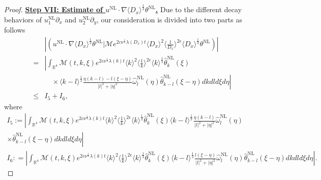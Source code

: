 \documentclass[reqno, 12pt]{amsart} %
\theoremstyle{plain} %
\theoremstyle{definition}
\theoremstyle{remark}
\numberwithin{equation}{section} %
\newcommand{\lt}{\left}
\newcommand{\rt}{\right}
\newcommand{\px}{\partial_x}
\newcommand{\py}{\partial_y}
\begin{document}
\begin{proof}
		
		
		\underline{\bf Step VII: Estimate of $   u^{\mathrm{NL}} \cdot  \nabla \langle D_x \rangle^\frac13 \theta^{\mathrm{NL}}$.} Due to the different decay behaviors of $u_1^{\mathrm{NL}} \px    $ and $u_2^{\mathrm{NL}} \py   $, our consideration is divided into two parts as follows
		$$
		\begin{aligned}
			& \left|\left(  u^{\mathrm{NL}} \cdot \nabla \langle D_x \rangle^\frac13 \theta^{\mathrm{NL}} \big| \mathcal{M} e^{2 c \nu^{\frac{1}{3}} \lambda\left(D_x\right) t}\langle D_x\rangle^2\langle\frac{1}{D_x}\rangle^{2 \epsilon} \langle D_x \rangle^\frac13 \theta^{\mathrm{NL}} \right)\right| \\
			= & \left|\int_{\mathbb{R}^4} \mathcal{M}(t, k, \xi) e^{2 c \nu^{\frac{1}{3}} \lambda(k) t}\langle k\rangle^2\langle\frac{1}{k}\rangle^{2 \epsilon} \langle k \rangle^\frac13\hat{\theta}_k^{\mathrm{NL}}(\xi) \rt.\\
			&\lt.\quad \times \langle k-l \rangle^\frac13  \frac{\eta(k-l)-l(\xi-\eta)}{|l|^2+|\eta|^2} \hat{\omega}_l^{\mathrm{NL}}(\eta) \hat{\theta}_{k-l}^{\mathrm{NL}}(\xi-\eta) d k d l d \xi d \eta\right| \\
			\leq & I_5+I_6,
		\end{aligned}
		$$ 
		where
		$$
		\begin{gathered}
			I_5 :=\left| \int_{\mathbb{R}^4} \mathcal{M}(t, k, \xi) e^{2 c \nu^{\frac{1}{3}} \lambda(k) t}\langle k\rangle^2\langle\frac{1}{k}\rangle^{2 \epsilon} \langle k \rangle^\frac13\hat{\theta}_k^{\mathrm{NL}}(\xi) \langle k-l \rangle^\frac13  \frac{\eta(k-l) }{|l|^2+|\eta|^2} \hat{\omega}_l^{\mathrm{NL}}(\eta)\right. \\ \lt.
			\times \hat{\theta}_{k-l}^{\mathrm{NL}}(\xi-\eta) d k d l d \xi d \eta \rt| \\
			I_6 : =\left|\int_{\mathbb{R}^4} \mathcal{M}(t, k, \xi) e^{2 c \nu^{\frac{1}{3}} \lambda(k) t}\langle k\rangle^2\langle\frac{1}{k}\rangle^{2 \epsilon} \langle k \rangle^\frac13\hat{\theta}_k^{\mathrm{NL}}(\xi) \langle k-l \rangle^\frac13  \frac{ l(\xi - \eta )}{|l|^2+|\eta|^2} \hat{\omega}_l^{\mathrm{NL}}(\eta) \hat{\theta}_{k-l}^{\mathrm{NL}}(\xi-\eta) d k d l d \xi d \eta\right| .
		\end{gathered}
		$$  
		

\end{proof}
\end{document}
